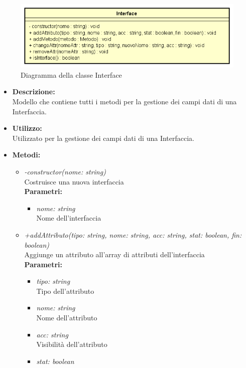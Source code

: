 \begin{figure}[h!]
	\centering
	\includegraphics[scale=0.8]{res/sections/SpecificaFrontEnd/Services/Disegnetti/interface.png}
	\caption{Diagramma della classe Interface}
\end{figure}

\begin{itemize}
	\item \textbf{Descrizione:}\\
	Modello che contiene tutti i metodi per la gestione dei campi dati di una Interfaccia.
	\item \textbf{Utilizzo:}\\
	Utilizzato per  la gestione dei campi dati di una Interfaccia.
	\item \textbf{Metodi:}
		\begin{itemize}
			\item \emph{-constructor(nome: string)}\\
    		Costruisce una nuova interfaccia\\
    		\textbf{Parametri:}
    		\begin{itemize}
    			\item \emph{nome: string}\\
    			Nome dell'interfaccia
    		\end{itemize}
    		\item \emph{+addAttributo(tipo: string, nome: string, acc: string, stat: boolean, fin: boolean)}\\
    		Aggiunge un attributo all'array di attributi dell'interfaccia\\
    		\textbf{Parametri:}
    		\begin{itemize}
    			\item \emph{tipo: string}\\
    			Tipo dell'attributo
    			\item \emph{nome: string}\\
    			Nome dell'attributo
    			\item \emph{acc: string}\\
    			Visibilità dell'attributo
    			\item \emph{stat: boolean}\\

\end{itemize}
\end{itemize}
\end{itemize}
